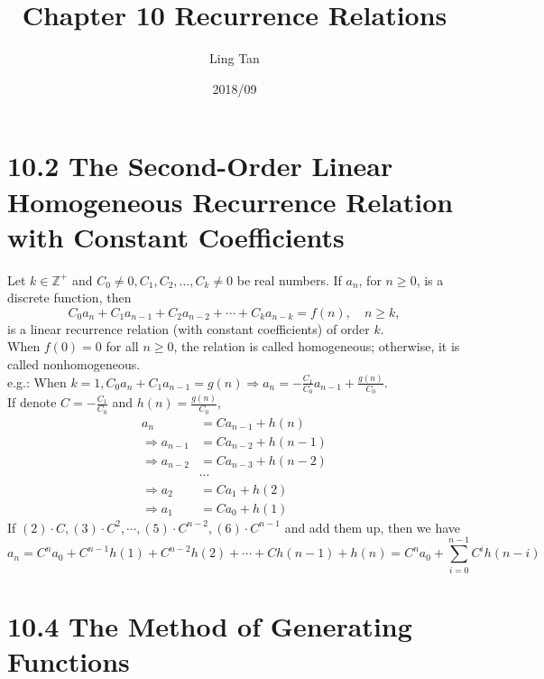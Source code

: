 \documentclass[a4paper]{article}
\title{Chapter 10 Recurrence Relations}
\author{Ling Tan}
\date{2018/09}
\begin{document}
\maketitle

\section*{10.2 The Second-Order Linear Homogeneous Recurrence Relation with Constant Coefficients}
Let $k\in\mathbb{Z}^+$ and $C_0\neq0,C_1,C_2, \ldots, C_k\neq 0$ be real numbers. If $a_n$, for $n\geq0$, is a discrete function, then
$$C_0a_n+C_1a_{n-1}+C_2a_{n-2}+\cdots+C_ka_{n-k}=f(n),\quad n\geq k,$$
is a linear recurrence relation (with constant coefficients) of order $k$.\\
When $f(0)=0$ for all $n\geq0$, the relation is called homogeneous; otherwise, it is called nonhomogeneous.\\
\color{red}e.g.: \color{black} When $k=1, C_0a_n+C_1a_{n-1}=g(n)\Rightarrow a_n=-\frac{C_1}{C_0}a_{n-1}+\frac{g(n)}{C_0}$.\\
If denote $C=-\frac{C_1}{C_0}$ and $h(n)=\frac{g(n)}{C_0}$,\\
\begin{align}
    a_n&=Ca_{n-1}+h(n)\\
    \Rightarrow a_{n-1}&=Ca_{n-2}+h(n-1)\\
    \Rightarrow a_{n-2}&=Ca_{n-3}+h(n-2)\\
    &\cdots\\
    \Rightarrow a_{2}&=Ca_{1}+h(2)\\
    \Rightarrow a_{1}&=Ca_{0}+h(1)
\end{align}
If $(2)\cdot C, (3)\cdot C^2,\cdots, (5)\cdot C^{n-2}, (6)\cdot C^{n-1}$ and add them up, then we have
$$a_n=C^na_0+C^{n-1}h(1)+C^{n-2}h(2)+\cdots + Ch(n-1)+h(n)=C^na_0+\sum_{i=0}^{n-1}{C^ih(n-i)}$$

\section*{10.4 The Method of Generating Functions}
\end{document}
